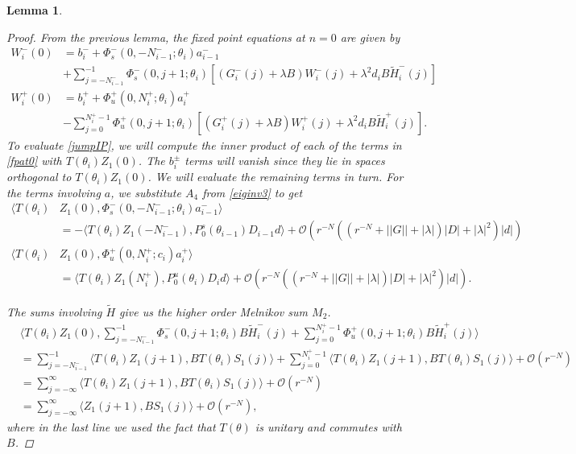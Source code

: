 \documentclass[12pt]{elsarticle}
\newtheorem{lemma}{Lemma}
\begin{document}
\begin{lemma}
\begin{proof}
From the previous lemma, the fixed point equations at $n = 0$ are given by 
\begin{equation}\label{fpat0}
\begin{aligned}
W_i^-(0) &= b_i^- +
\Phi_s^-(0, -N_{i-1}^-; \theta_i) a_{i-1}^- \\
&+ \sum_{j = -N_{i-1}^-}^{-1} \Phi_s^-(0, j+1; \theta_i)
[(G_i^-(j) + \lambda B) W_i^-(j) + \lambda^2 d_i B \tilde{H}_i^-(j)] \\
W_i^+(0) &= b_i^+ + \Phi_u^+(0, N_i^+; \theta_i) a_i^+ \\
&- \sum_{j = 0}^{N_i^+-1} \Phi_u^+(0, j+1; \theta_i) 
[(G_i^+(j) + \lambda B) W_i^+(j) + \lambda^2 d_i B \tilde{H}_i^+(j)].
\end{aligned}
\end{equation}
To evaluate \cref{jumpIP}, we will compute the inner product of each of the terms in \cref{fpat0} with $T(\theta_i)Z_1(0)$. The $b_i^\pm$ terms will vanish since they lie in spaces orthogonal to $T(\theta_i) Z_1(0)$. We will evaluate the remaining terms in turn. For the terms involving $a$, we substitute $A_4$ from \cref{eiginv3} to get
\begin{align*}
\langle T(\theta_i) &Z_1(0), \Phi_s^-(0, -N_{i-1}^-; \theta_i) a_{i-1}^- \rangle \\
&= -\langle T(\theta_i) Z_1(-N_{i-1}^-), P_0^s(\theta_{i-1}) D_{i-1} d \rangle + \mathcal{O}\left(r^{-N}( (r^{-N} + ||G|| + |\lambda|)|D| + |\lambda|^2 )|d| \right) \\
\langle T(\theta_i) &Z_1(0), \Phi_u^+(0, N_i^+; c_i) a_i^+ \rangle \\
&= \langle T(\theta_i) Z_1(N_i^+), P_0^u(\theta_i) D_i d \rangle + \mathcal{O}\left(r^{-N}( (r^{-N} + ||G|| + |\lambda|)|D| + |\lambda|^2 )|d| \right).
\end{align*}

The sums involving $\tilde{H}$ give us the higher order Melnikov sum $M_2$.
\begin{align*}
&\langle T(\theta_i) Z_1(0), \sum_{j = -N_{i-1}^-}^{-1} \Phi_s^-(0, j+1; \theta_i) B \tilde{H}_i^-(j) + \sum_{j = 0}^{N_i^+-1} \Phi_u^+(0, j+1; \theta_i) B \tilde{H}_i^+(j) \rangle \\
&= \sum_{j = -N_{i-1}^-}^{-1} \langle T(\theta_i) Z_1(j+1), B T(\theta_i) S_1(j) \rangle + \sum_{j = 0}^{N_i^+-1} \langle T(\theta_i) Z_1(j+1), B T(\theta_i) S_1(j) \rangle + \mathcal{O}(r^{-N})\\
&= \sum_{j = -\infty}^{\infty} \langle T(\theta_i) Z_1(j+1), B T(\theta_i) S_1(j)\rangle + \mathcal{O}(r^{-N}) \\
&= \sum_{j = -\infty}^{\infty} \langle Z_1(j+1), B S_1(j)\rangle + \mathcal{O}(r^{-N}),
\end{align*}
where in the last line we used the fact that $T(\theta)$ is unitary and commutes with $B$.


\end{proof}
\end{lemma}
\end{document}
